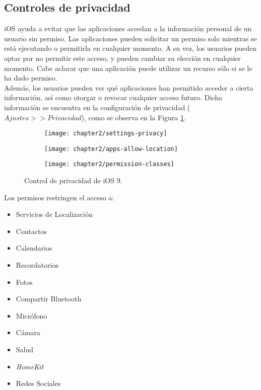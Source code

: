 \subsection{Controles de privacidad}
iOS ayuda a evitar que las aplicaciones accedan a la información personal de un usuario sin permiso. Las aplicaciones pueden solicitar un permiso solo mientras se est\'a ejecutando o permitirla en cualquier momento. A su vez, los usuarios pueden optar por no permitir este acceso, y pueden cambiar su elección en cualquier momento. Cabe aclarar que una aplicación puede utilizar un recurso sólo si se le ha dado permiso.\\
Además, los usuarios pueden ver qué aplicaciones han permitido acceder a cierta información, así como otorgar o revocar cualquier acceso futuro. Dicha informaci\'on se encuentra en la configuración de privacidad ($Ajustes>>Privacidad$), como se observa en la Figura \ref{fig:ch02:permissions-capture}.\\
\begin{figure}[hbtp]
    \centering
    \begin{subfigure}{0.3\linewidth}
	    \texttt{[image: chapter2/settings-privacy]}
	\end{subfigure}
    \begin{subfigure}{0.3\linewidth}
	    \texttt{[image: chapter2/apps-allow-location]}
	\end{subfigure}
    \begin{subfigure}{0.3\linewidth}
	    \texttt{[image: chapter2/permission-classes]}
    \end{subfigure}
    \caption{Control de privacidad de iOS 9.}
	\label{fig:ch02:permissions-capture}
\end{figure}
Los permisos restringen el acceso a:
\begin{multicols}{2}
    \begin{itemize}
        \item Servicios de Localizaci\'on
        \item Contactos
        \item Calendarios
        \item Recordatorios
        \item Fotos
        \item Compartir Bluetooth
        \item Micr\'ofono
        \item C\'amara
        \item Salud
        \item \textit{HomeKit}
        \item Redes Sociales
    \end{itemize} 
\end{multicols}